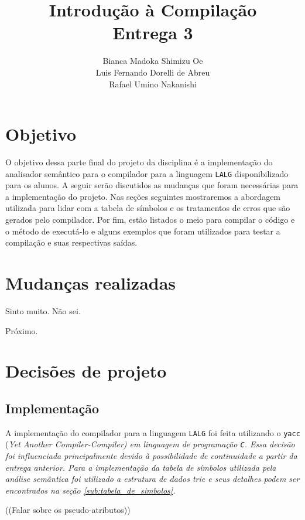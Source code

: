\documentclass{article}
\title{Introdução à Compilação\\Entrega 3}
\author{Bianca Madoka Shimizu Oe\\
		Luis Fernando Dorelli de Abreu\\
		Rafael Umino Nakanishi}
\date{}
\begin{document}
\maketitle

\section{Objetivo} %
\label{sec:objetivo}
	O objetivo dessa parte final do projeto da disciplina é a implementação do analisador semântico para o compilador para a linguagem \verb=LALG= disponibilizado para os alunos. A seguir serão discutidos as mudanças que foram necessárias para a implementação do projeto. Nas seções seguintes mostraremos a abordagem utilizada para lidar com a tabela de símbolos e os tratamentos de erros que são gerados pelo compilador. Por fim, estão listados o meio para compilar o código e o método de executá-lo e alguns exemplos que foram utilizados para testar a compilação e suas respectivas saídas.


\section{Mudanças realizadas} %
\label{sec:mudancas_realizadas}
	Sinto muito. Não sei.

	Próximo.

\section{Decisões de projeto} %
\label{sec:decisoes_de_projeto}
	\subsection{Implementação} %
	\label{ssub:implementacao}
		A implementação do compilador para a linguagem \verb=LALG= foi feita utilizando o \verb=yacc= (\em Yet Another Compiler-Compiler\normalfont) em linguagem de programação \verb=C=. Essa decisão foi influenciada principalmente devido à possibilidade de continuidade a partir da entrega anterior. Para a implementação da tabela de símbolos utilizada pela análise semântica foi utilizado a estrutura de dados \emph{trie} e seus detalhes podem ser encontrados na seção \ref{sub:tabela_de_simbolos}.

		((Falar sobre os pseudo-atributos))
	
\end{document}
